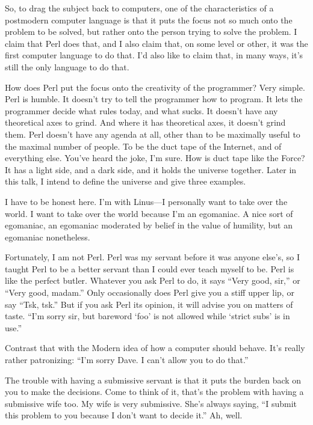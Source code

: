 \documentclass[10pt,letterpaper]{article}
\begin{document}
So, to drag the subject back to computers, one of the characteristics of a
postmodern computer language is that it puts the focus not so much onto the
problem to be solved, but rather onto the person trying to solve the problem.
I claim that Perl does that, and I also claim that, on some level or other,
it was the first computer language to do that. I'd also like to claim that,
in many ways, it's still the only language to do that.

How does Perl put the focus onto the creativity of the programmer? Very
simple. Perl is humble. It doesn't try to tell the programmer how to program.
It lets the programmer decide what rules today, and what sucks. It doesn't
have any theoretical axes to grind. And where it has theoretical axes, it
doesn't grind them. Perl doesn't have any agenda at all, other than to be
maximally useful to the maximal number of people. To be the duct tape of the
Internet, and of everything else. You've heard the joke, I'm sure. How is
duct tape like the Force? It has a light side, and a dark side, and it holds
the universe together. Later in this talk, I intend to define the universe
and give three examples.

I have to be honest here. I'm with Linus---I personally want to take over the
world. I want to take over the world because I'm an egomaniac. A nice sort of
egomaniac, an egomaniac moderated by belief in the value of humility, but an
egomaniac nonetheless.

Fortunately, I am not Perl. Perl was my servant before it was anyone else's,
so I taught Perl to be a better servant than I could ever teach myself to be.
Perl is like the perfect butler. Whatever you ask Perl to do, it says ``Very
good, sir,'' or ``Very good, madam.'' Only occasionally does Perl give you
a stiff upper lip, or say ``Tsk, tsk.'' But if you ask Perl its opinion, it
will advise you on matters of taste. ``I'm sorry sir, but bareword `foo' is
not allowed while `strict subs' is in use.''

Contrast that with the Modern idea of how a computer should behave. It's
really rather patronizing: ``I'm sorry Dave. I can't allow you to do
that.''

The trouble with having a submissive servant is that it puts the burden back
on you to make the decisions. Come to think of it, that's the problem with
having a submissive wife too. My wife is very submissive. She's always
saying, ``I submit this problem to you because I don't want to decide it.''
Ah, well.
\end{document}
